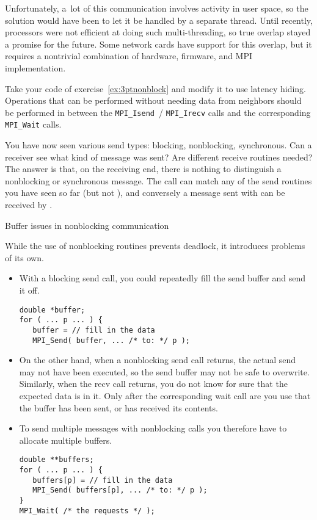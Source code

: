 Unfortunately, a~lot of this
communication involves activity in user space, so the solution would
have been to let it be handled by a separate thread. Until recently,
processors were not efficient at doing such multi-threading, so true
overlap stayed a promise for the future. Some network cards have
support for this overlap, but it requires a nontrivial combination of
hardware, firmware, and MPI implementation.

\begin{exercise}
  \label{ex:3ptnonblock-hide}
  Take your code of exercise~\ref{ex:3ptnonblock} and modify it to use
  latency hiding. Operations that can be performed without needing
  data from neighbors should be performed in between the
  \lstinline{MPI_Isend}~/ \lstinline{MPI_Irecv} calls and the
  corresponding \lstinline{MPI_Wait} calls.
\end{exercise}

\begin{remark}
  You have now seen various send types: blocking, nonblocking, synchronous.
  Can a receiver see what kind of message was sent? Are different receive
  routines needed?
  The answer is that, on the receiving end, there is nothing to distinguish
  a nonblocking or
  synchronous message. The  call can match any of the
  send routines you have seen so far (but not ), and
  conversely a message sent with 
  can be received by .
\end{remark}

 {Buffer issues in nonblocking communication}

While the use of nonblocking routines prevents deadlock, it
introduces problems of its own.

\begin{itemize}
\item With a blocking send call, you could repeatedly fill the send
  buffer and send it off.
\begin{lstlisting}
double *buffer;
for ( ... p ... ) {
   buffer = // fill in the data
   MPI_Send( buffer, ... /* to: */ p );
\end{lstlisting}
\item On the other hand, when a nonblocking send call returns,
  the actual send may not have been executed,
  so the send buffer may not be safe to overwrite.
  Similarly, when the recv call returns, you do not know for sure that
  the expected data is in it. Only after the corresponding wait call
  are you use that the buffer has been sent, or has received its contents.
\item 
  To send multiple messages with nonblocking calls
  you therefore have to allocate multiple buffers.
\begin{lstlisting}
double **buffers;
for ( ... p ... ) {
   buffers[p] = // fill in the data
   MPI_Send( buffers[p], ... /* to: */ p );
}
MPI_Wait( /* the requests */ );
\end{lstlisting}
\end{itemize}

